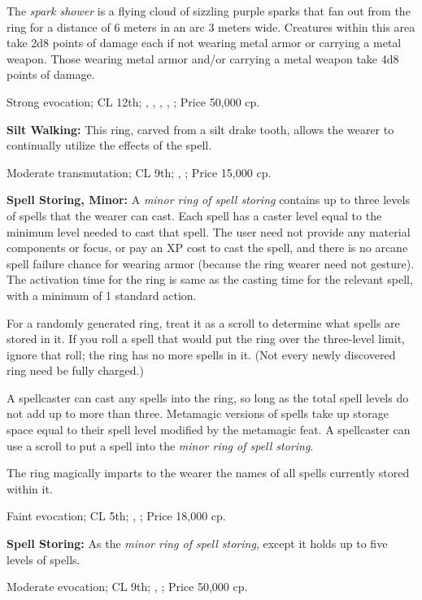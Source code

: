 The \emph{spark shower} is a flying cloud of sizzling purple sparks that fan out from the ring for a distance of 6 meters in an arc 3 meters wide. Creatures within this area take 2d8 points of damage each if not wearing metal armor or carrying a metal weapon. Those wearing metal armor and/or carrying a metal weapon take 4d8 points of damage.

Strong evocation; CL 12th; , , , , ; Price 50,000 cp.


\textbf{Silt Walking:} This ring, carved from a silt drake tooth, allows the wearer to continually utilize the effects of the  spell.

Moderate transmutation; CL 9th; , ; Price 15,000 cp.


\textbf{Spell Storing, Minor:} A \emph{minor ring of spell storing} contains up to three levels of spells that the wearer can cast. Each spell has a caster level equal to the minimum level needed to cast that spell. The user need not provide any material components or focus, or pay an XP cost to cast the spell, and there is no arcane spell failure chance for wearing armor (because the ring wearer need not gesture). The activation time for the ring is same as the casting time for the relevant spell, with a minimum of 1 standard action.

For a randomly generated ring, treat it as a scroll to determine what spells are stored in it. If you roll a spell that would put the ring over the three-level limit, ignore that roll; the ring has no more spells in it. (Not every newly discovered ring need be fully charged.)

A spellcaster can cast any spells into the ring, so long as the total spell levels do not add up to more than three. Metamagic versions of spells take up storage space equal to their spell level modified by the metamagic feat. A spellcaster can use a scroll to put a spell into the \emph{minor ring of spell storing}.

The ring magically imparts to the wearer the names of all spells currently stored within it.

Faint evocation; CL 5th; , ; Price 18,000 cp.


\textbf{Spell Storing:} As the \emph{minor ring of spell storing}, except it holds up to five levels of spells.

Moderate evocation; CL 9th; , ; Price 50,000 cp.


